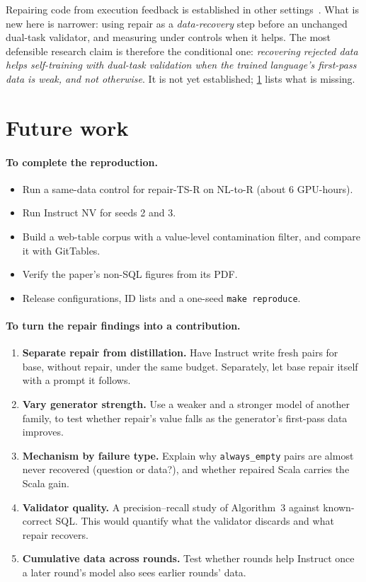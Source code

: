 Repairing code from execution feedback is established in other settings~\cite{chen2023selfdebug}. What is new here is
narrower: using repair as a \emph{data-recovery} step before an unchanged dual-task validator, and measuring under
controls when it helps. The most defensible research claim is therefore the conditional one: \emph{recovering rejected
data helps self-training with dual-task validation when the trained language's first-pass data is weak, and not
otherwise}. It is not yet established; \cref{sec:future} lists what is missing.

\section{Future work}\label{sec:future}

\paragraph{To complete the reproduction.}
\begin{itemize}
\item Run a same-data control for repair-TS-R on NL-to-R (about 6 GPU-hours).
\item Run Instruct NV for seeds 2 and 3.
\item Build a web-table corpus with a value-level contamination filter, and compare it with GitTables.
\item Verify the paper's non-SQL figures from its PDF.
\item Release configurations, ID lists and a one-seed \texttt{make reproduce}.
\end{itemize}

\paragraph{To turn the repair findings into a contribution.}
\begin{enumerate}
\item \textbf{Separate repair from distillation.} Have Instruct write fresh pairs for base, without repair, under the
same budget. Separately, let base repair itself with a prompt it follows.
\item \textbf{Vary generator strength.} Use a weaker and a stronger model of another family, to test whether repair's
value falls as the generator's first-pass data improves.
\item \textbf{Mechanism by failure type.} Explain why \texttt{always\_empty} pairs are almost never recovered (question
or data?), and whether repaired Scala carries the Scala gain.
\item \textbf{Validator quality.} A precision--recall study of Algorithm~3 against known-correct SQL. This would
quantify what the validator discards and what repair recovers.
\item \textbf{Cumulative data across rounds.} Test whether rounds help Instruct once a later round's model also sees
earlier rounds' data.
\end{enumerate}
